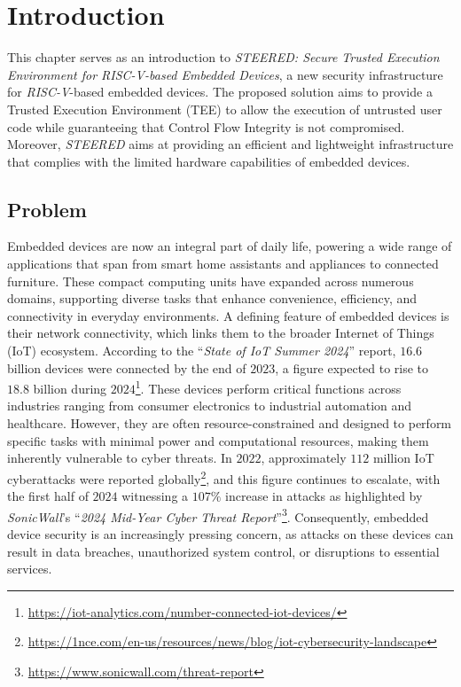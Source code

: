 \chapter{Introduction}
\label{cha:introduction}

This chapter serves as an introduction to \textit{STEERED: Secure Trusted Execution
Environment for RISC-V-based Embedded Devices}, a new security infrastructure
for \textit{RISC-V}-based embedded devices. The proposed solution aims to
provide a Trusted Execution Environment (TEE) to allow the execution of
untrusted user code while guaranteeing that Control Flow Integrity is not
compromised. Moreover, \textit{STEERED} aims at providing an efficient and lightweight
infrastructure that complies with the limited hardware capabilities of embedded devices.

\section{Problem}
\label{sec:intro_context}

Embedded devices are now an integral part of daily life, powering a wide range of
applications that span from smart home assistants and appliances to connected furniture.
These compact computing units have expanded across numerous domains, supporting diverse
tasks that enhance convenience, efficiency, and connectivity in everyday environments.
A defining feature of embedded devices is their network connectivity, which links
them to the broader Internet of Things (IoT) ecosystem. According to the ``\textit{State
of IoT Summer 2024}'' report, $16.6$ billion devices were connected by the end
of $2023$, a figure expected to rise to $18.8$ billion during $2024$\footnote{\url{https://iot-analytics.com/number-connected-iot-devices/}}.
These devices perform critical functions across industries ranging from consumer
electronics to industrial automation and healthcare. However, they are often resource-constrained
and designed to perform specific tasks with minimal power and computational resources,
making them inherently vulnerable to cyber threats. In $2022$, approximately
$112$ million IoT cyberattacks were reported globally\footnote{\url{https://1nce.com/en-us/resources/news/blog/iot-cybersecurity-landscape}},
and this figure continues to escalate, with the first half of $2024$ witnessing a
$107\%$ increase in attacks as highlighted by \textit{SonicWall}'s ``\textit{2024
Mid-Year Cyber Threat Report}''\footnote{\url{https://www.sonicwall.com/threat-report}}.
Consequently, embedded device security is an increasingly pressing concern, as attacks
on these devices can result in data breaches, unauthorized system control, or disruptions
to essential services.

